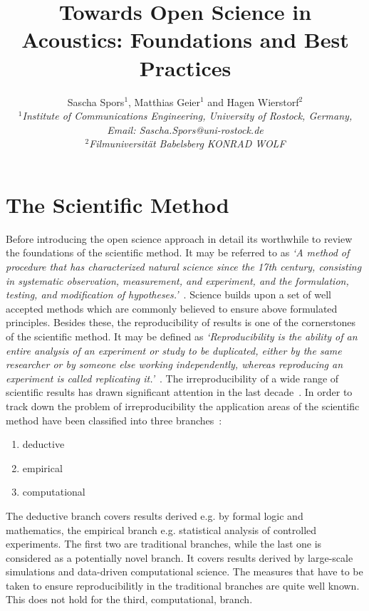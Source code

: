 \documentclass[a4paper, 10pt, twocolumn]{article}
\date{}                                         %
\title{\vspace{-8mm}\textbf{\large
Towards Open Science in Acoustics: Foundations and Best Practices}}
\author{
Sascha Spors$^1$, Matthias Geier$^1$ and Hagen Wierstorf$^2$\\
$^1$\emph{\small Institute of Communications Engineering, University of Rostock, Germany, Email: Sascha.Spors@uni-rostock.de}\\
$^2$\emph{\small Filmuniversität Babelsberg KONRAD WOLF}}
\begin{document}
\maketitle
\thispagestyle{empty}           %

\section*{The Scientific Method} \label{sec:intro} 

Before introducing the open science approach in detail its worthwhile to review the
foundations of the scientific method. It may be referred to  as 
\emph{`A method of procedure that has characterized natural science since the 17th 
century, consisting in systematic observation, measurement, and experiment, and the 
formulation, testing, and modification of hypotheses.'}~\cite{scientific_method:OXD}. 
Science builds upon a set of well accepted methods which are commonly believed to
ensure above formulated principles. Besides these, the reproducibility of results is 
one of the cornerstones of the scientific method. 
It may be defined as \emph{`Reproducibility is the ability of an entire analysis of 
an experiment or study to be duplicated, either by the same researcher or by someone 
else working independently, whereas reproducing an experiment is called replicating 
it.'}~\cite{Leek15:PNAS}. 
The irreproducibility of a wide range of scientific results has drawn significant 
attention in the last decade~\cite{Borgwardt:Book,retraction:WWW,ioannidis05:PLOS, open15:AAAS, chalmers09:OG, freedman15:PLOS, howells14:Nature}. 
In order to track down the problem of irreproducibility the application areas of 
the scientific method have been classified into three branches~\cite{Donoho:CSE,Stodden2014:talk}:
\begin{enumerate}
\item deductive
\item empirical
\item computational
\end{enumerate}
The deductive branch covers results derived e.g. by formal logic and mathematics, the empirical
branch e.g. statistical analysis of controlled experiments. The first two are traditional branches, 
while the last one is considered as a potentially novel branch. It covers results derived by large-scale simulations
and data-driven computational science. The measures that have to be taken to ensure reproducibilitly
in the traditional branches are quite well known. This does not hold for the third, computational, branch.
\end{document}
